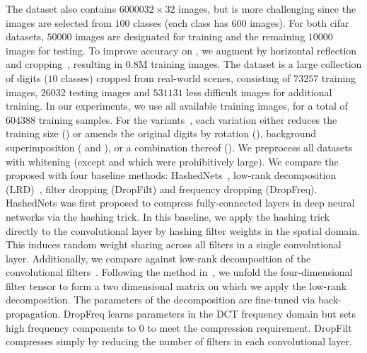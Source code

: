 \documentclass{article} %
\begin{document}
The  dataset also contains $60000$$32\times32$ images, but is more challenging since the images are selected from $100$ classes (each class has 600 images).
For both {\sc cifar} datasets, $50000$ images are designated for training and the remaining $10000$ images for testing.
To improve accuracy on , we augment by horizontal reflection and cropping~\cite{krizhevsky2012imagenet}, resulting in $0.8$M training images.
The  dataset is a large collection of digits ($10$ classes) cropped from real-world scenes, consisting of $73257$ training images, $26032$ testing images and $531131$ less difficult images for additional training.
In our experiments, we use all available training images, for a total of $604388$ training samples.
For the  variants~\cite{larochelle2007empirical}, each variation either reduces the training size ({}) or amends the original digits by rotation ({}), background superimposition ({} and {}), or a combination thereof ({}).
We preprocess all datasets with whitening (except  and  which were prohibitively large).%
We compare the proposed \abbrev{} with four baseline methods:
HashedNets~\cite{chen2015compressing}, low-rank decomposition (LRD)~\cite{denil2013predicting}, filter dropping (DropFilt) and frequency dropping (DropFreq).
HashedNets was first proposed to compress fully-connected layers in deep neural networks via the hashing trick.
In this baseline, we apply the hashing trick directly to the convolutional layer by hashing filter weights in the spatial domain.
This induces random weight sharing across all filters in a single convolutional layer.
Additionally, we compare against low-rank decomposition of the convolutional filters~\cite{denil2013predicting}.
Following the method in~\cite{denton2014exploiting}, we unfold the four-dimensional filter tensor to form a two dimensional matrix on which we apply the low-rank decomposition.
The parameters of the decomposition are fine-tuned via back-propagation.
DropFreq learns parameters in the DCT frequency domain but sets high frequency components to $0$ to meet the compression requirement.
DropFilt compresses simply by reducing the number of filters in each convolutional layer.
\end{document}
